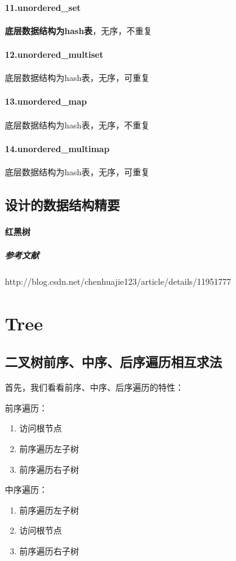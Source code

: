 \documentclass[UTF8,a4paper,12pt]{ctexbook}
\begin{document}
		 \paragraph{11.unordered\_set }    \textbf{底层数据结构为hash表}，无序，不重复
		 
		 \paragraph{12.unordered\_multiset} 底层数据结构为hash表，无序，可重复 
		 
		 \paragraph{13.unordered\_map}    底层数据结构为hash表，无序，不重复
		 
		 \paragraph{14.unordered\_multimap} 底层数据结构为hash表，无序，可重复  
	\subsection{设计的数据结构精要}
		\paragraph{红黑树}
			\subparagraph{参考文献}http://blog.csdn.net/chenhuajie123/article/details/11951777
			
\section{Tree}
	\subsection{二叉树前序、中序、后序遍历相互求法}
		首先，我们看看前序、中序、后序遍历的特性： 
		
		前序遍历： 
		\begin{enumerate}[itemindent = 2em]
			\item 访问根节点 
			\item 前序遍历左子树 
			\item 前序遍历右子树
		\end{enumerate}
		
		中序遍历： 
		\begin{enumerate}[itemindent = 2em]
			\item 前序遍历左子树 
			\item 访问根节点 
			\item 前序遍历右子树
		\end{enumerate}
		
\end{document}

